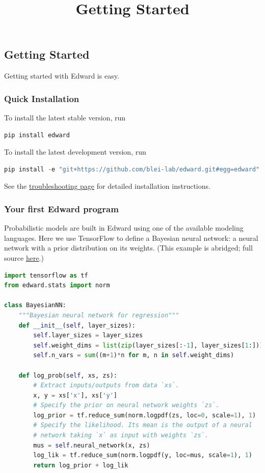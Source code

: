 \title{Getting Started}

\subsection{Getting Started}
Getting started with Edward is easy.

\subsubsection{Quick Installation}
To install the latest stable version, run

\begin{lstlisting}[language=Java]
pip install edward
\end{lstlisting}

To install the latest development version, run

\begin{lstlisting}[language=Java]
pip install -e "git+https://github.com/blei-lab/edward.git#egg=edward"
\end{lstlisting}

See the \href{troubleshooting}{troubleshooting page} for detailed
installation instructions.


\subsubsection{Your first Edward program}

Probabilistic models are built in Edward using one of the available
modeling languages. Here we use TensorFlow to define a Bayesian neural
network: a neural network with a prior distribution on its weights.
(This example is abridged; full source
\href{https://github.com/blei-lab/edward/blob/master/examples/getting_started_example.py}
{here}.)
\begin{lstlisting}[language=Python]
import tensorflow as tf
from edward.stats import norm

class BayesianNN:
    """Bayesian neural network for regression"""
    def __init__(self, layer_sizes):
        self.layer_sizes = layer_sizes
        self.weight_dims = list(zip(layer_sizes[:-1], layer_sizes[1:]))
        self.n_vars = sum((m+1)*n for m, n in self.weight_dims)

    def log_prob(self, xs, zs):
        # Extract inputs/outputs from data `xs`.
        x, y = xs['x'], xs['y']
        # Specify the prior on neural network weights `zs`.
        log_prior = tf.reduce_sum(norm.logpdf(zs, loc=0, scale=1), 1)
        # Specify the likelihood. Its mean is the output of a neural
        # network taking `x` as input with weights `zs`.
        mus = self.neural_network(x, zs)
        log_lik = tf.reduce_sum(norm.logpdf(y, loc=mus, scale=1), 1)
        return log_prior + log_lik
\end{lstlisting}

